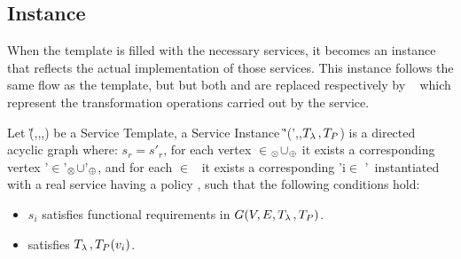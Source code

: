 
\subsection{Instance}
When the template is filled with the necessary services, it becomes an instance that reflects the actual implementation of those services.
This instance follows the same flow as the template, but but both \myLambda and \myGamma are replaced respectively by \iChartFunction~ which represent the transformation operations carried out by the service.

Let \G(\V,\E,\myLambda,\myGamma) be a Service Template, a Service Instance \G'(\V',\E,$T_{\lambda\,{}},T_P$) is a directed acyclic graph where:
$s_r=s'_r$, for each vertex \vi{}$\in$\V$_{\otimes}$$\cup$\V$_{\oplus}$ it exists a corresponding vertex \vi{}'$\in$\V'$_{\otimes}$$\cup$\V'$_{\oplus}$,
    and for each $\in$ \V\ it exists a corresponding \vi'{i}$\in$ \V'\ instantiated with a real service  having a policy , such that the following conditions hold:
    \begin{itemize}
      \item $s_i$ satisfies functional requirements in $G(V,E,T_{\lambda\,{}},T_P)$.
      \item {} satisfies $T_{\lambda\,{}},T_P(v_i)$.
    \end{itemize}

